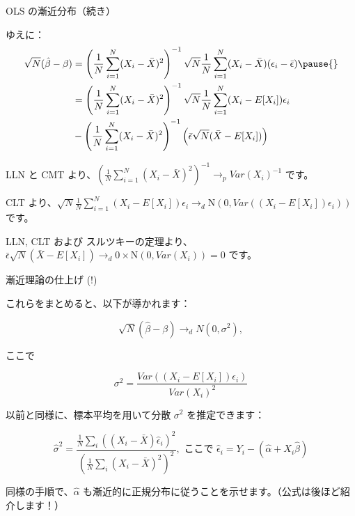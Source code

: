 \documentclass[11pt,handout]{beamer}
\newenvironment{wideitemize}{\itemize\addtolength{\itemsep}{10pt}}{\enditemize}
\begin{document}
\begin{frame}{OLS の漸近分布（続き）}
\begin{wideitemize}
	\item	ゆえに：
	\begin{align*}
		\sqrt{N}(\hat\beta - \beta) &= \left( \frac{1}{N} \sum_{i=1}^N (X_i - \bar{X})^2 \right)^{-1}  \sqrt{N} \frac{1}{N} \sum_{i=1}^N (X_i - \bar{X})(\epsilon_i - \bar{\epsilon}) \pause{} \\
		&= \left( \frac{1}{N} \sum_{i=1}^N (X_i - \bar{X})^2 \right)^{-1} \sqrt{N}\frac{1}{N} \sum_{i=1}^N (X_i - E[X_i])\epsilon_i \\
		&-\left( \frac{1}{N} \sum_{i=1}^N (X_i - \bar{X})^2 \right)^{-1}  \left( \bar{\epsilon} \sqrt{N} (\bar{X} - E[X_i]) \right)
	\end{align*}

	\item
	LLN と CMT より、$\left( \frac{1}{N} \sum_{i=1}^N (X_i - \bar{X})^2 \right)^{-1} \rightarrow_p Var(X_i)^{-1}$ です。
	
	\pause
	\item
	CLT より、$\sqrt{N}\frac{1}{N} \sum_{i=1}^N (X_i - E[X_i])\epsilon_i \rightarrow_d \mathrm{N}(0, Var((X_i - E[X_i])\epsilon_i))$ です。
	
	\pause
	\item
	LLN, CLT および スルツキーの定理より、 $\bar{\epsilon} \sqrt{N} (\bar{X} - E[X_i]) \rightarrow_d 0 \times \mathrm{N}(0, Var(X_i))  = 0$ です。
	
\end{wideitemize}

\end{frame}

\begin{frame}{漸近理論の仕上げ (!)}
	
	\begin{wideitemize}
	\item
	これらをまとめると、以下が導かれます：
	
	$$\sqrt{N}(\hat\beta - \beta) \rightarrow_d N(0, \sigma^2),$$
	
	\noindent ここで
	
	$$\sigma^2 = \dfrac{  Var((X_i - E[X_i])\epsilon_i) }{ Var(X_i)^2  }$$ 
	
	\item
	以前と同様に、標本平均を用いて分散 $\sigma^2$ を推定できます：
	
	$$\hat\sigma^2 = \dfrac{  \frac{1}{N} \sum_i ((X_i - \bar{X})\hat\epsilon_i )^2}{ \left(\frac{1}{N} \sum_i (X_i - \bar{X})^2\right)^2  }, \text{ ここで } \hat\epsilon_i = Y_i - (\hat\alpha + X_i \hat\beta)$$ 
	
	
	\item
	\pause
	同様の手順で、$\hat\alpha$ も漸近的に正規分布に従うことを示せます。（公式は後ほど紹介します！）
\end{wideitemize}	
\end{frame}
		
\end{document}

